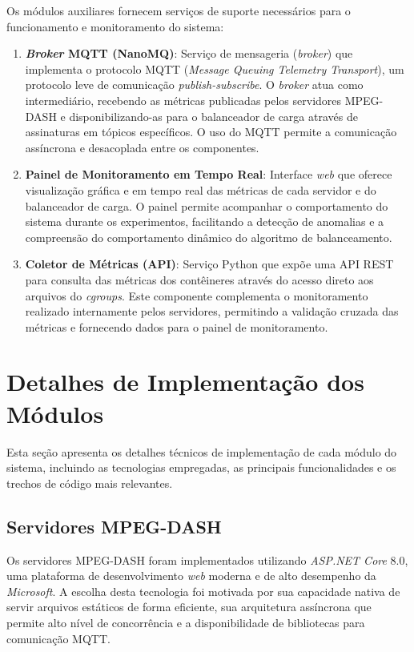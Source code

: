 Os módulos auxiliares fornecem serviços de suporte necessários para o funcionamento e monitoramento do sistema:

\begin{enumerate}
    \item \textbf{\textit{Broker} MQTT (NanoMQ)}: Serviço de mensageria (\textit{broker}) que implementa o protocolo MQTT (\textit{Message Queuing Telemetry Transport}), um protocolo leve de comunicação \textit{publish-subscribe}. O \textit{broker} atua como intermediário, recebendo as métricas publicadas pelos servidores MPEG-DASH e disponibilizando-as para o balanceador de carga através de assinaturas em tópicos específicos. O uso do MQTT permite a comunicação assíncrona e desacoplada entre os componentes.
    
    \item \textbf{Painel de Monitoramento em Tempo Real}: Interface \textit{web} que oferece visualização gráfica e em tempo real das métricas de cada servidor e do balanceador de carga. O painel permite acompanhar o comportamento do sistema durante os experimentos, facilitando a detecção de anomalias e a compreensão do comportamento dinâmico do algoritmo de balanceamento.
    
    \item \textbf{Coletor de Métricas (API)}: Serviço Python que expõe uma API REST para consulta das métricas dos contêineres através do acesso direto aos arquivos do \textit{cgroups}. Este componente complementa o monitoramento realizado internamente pelos servidores, permitindo a validação cruzada das métricas e fornecendo dados para o painel de monitoramento.
\end{enumerate}

\section{Detalhes de Implementação dos Módulos}

Esta seção apresenta os detalhes técnicos de implementação de cada módulo do sistema, incluindo as tecnologias empregadas, as principais funcionalidades e os trechos de código mais relevantes.

\subsection{Servidores MPEG-DASH}

Os servidores MPEG-DASH foram implementados utilizando \textit{ASP.NET Core} 8.0, uma plataforma de desenvolvimento \textit{web} moderna e de alto desempenho da \textit{Microsoft}. A escolha desta tecnologia foi motivada por sua capacidade nativa de servir arquivos estáticos de forma eficiente, sua arquitetura assíncrona que permite alto nível de concorrência e a disponibilidade de bibliotecas para comunicação MQTT.

